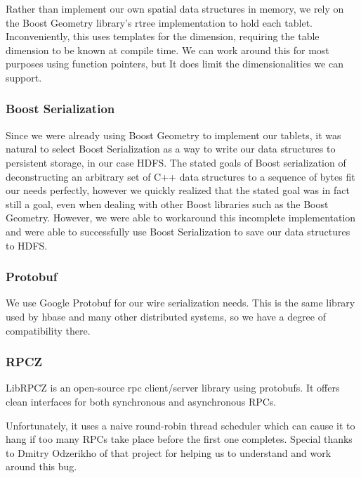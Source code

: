 \documentclass[11pt]{article}
\begin{document}
Rather than implement our own spatial data structures in memory, we rely on the Boost Geometry library's rtree implementation to hold each tablet. Inconveniently, this uses templates for the dimension, requiring the table dimension to be known at compile time. We can work around this for most purposes using function pointers, but It does limit the dimensionalities we can support.

\subsubsection{Boost Serialization}

Since we were already using Boost Geometry to implement our tablets, it was natural to select Boost Serialization as a way to write our data structures to persistent storage, in our case HDFS. The stated goals of Boost serialization of deconstructing an arbitrary set of C++ data structures to a sequence of bytes fit our needs perfectly, however we quickly realized that the stated goal was in fact still a goal, even when dealing with other Boost libraries such as the Boost Geometry. However, we were able to workaround this incomplete implementation and were able to successfully use Boost Serialization to save our data structures to HDFS.

\subsubsection{Protobuf}

We use Google Protobuf for our wire serialization needs. This is the same library used by hbase and many other distributed systems, so we have a degree of compatibility there.

\subsubsection{RPCZ}

LibRPCZ is an open-source rpc client/server library using protobufs. It offers clean interfaces for both synchronous and asynchronous RPCs.

Unfortunately, it uses a naive round-robin thread scheduler which can cause it to hang if too many RPCs take place before the first one completes. Special thanks to Dmitry Odzerikho of that project for helping us to understand and work around this bug.
\end{document}
